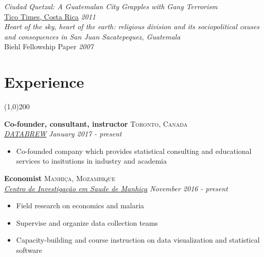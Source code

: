 \documentclass[11pt]{article}
\begin{document}
\noindent \emph{Ciudad Quetzal: A Guatemalan City Grapples with Gang Terrorism} \\ 
\href{http://www.ticotimes.net/2011/04/15/guatemala-city-grapples-with-gang-terrorism}{Tico Times, Costa Rica} \hfill \emph{2011}\\

\noindent \emph{Heart of the sky, heart of the earth: religious division and its sociopolitical causes and consequences in San Juan Sacatepequez, Guatemala} \\ Biehl Fellowship Paper \hfill \emph{2007}\\



\newpage
\section*{Experience} %
\vspace{-7mm}
\line(1,0){200}
\vspace{2mm}

\noindent \textbf{Co-founder, consultant, instructor} \hfill \textsc{Toronto, Canada}\\
\noindent \emph{\href{www.databrew.cc}{DATABREW}} \hfill \emph{January 2017 - present}
\vspace{-2mm}
\begin{itemize}\itemsep0pt \parskip0pt 
\item Co-founded company which provides statistical consulting and educational services to insitutions in industry and academia
\end{itemize}

\noindent \textbf{Economist} \hfill \textsc{Manhiça, Mozambique}\\
\noindent \emph{\href{www.manhica.org}{Centro de Investigação em Saude de Manhiça}} \hfill \emph{November 2016 - present}
\vspace{-2mm}
\begin{itemize}\itemsep0pt \parskip0pt 
\item Field research on economics and malaria
\item Supervise and organize data collection teams
\item Capacity-building and course instruction on data visualization and statistical software
\end{itemize}
\end{document}
